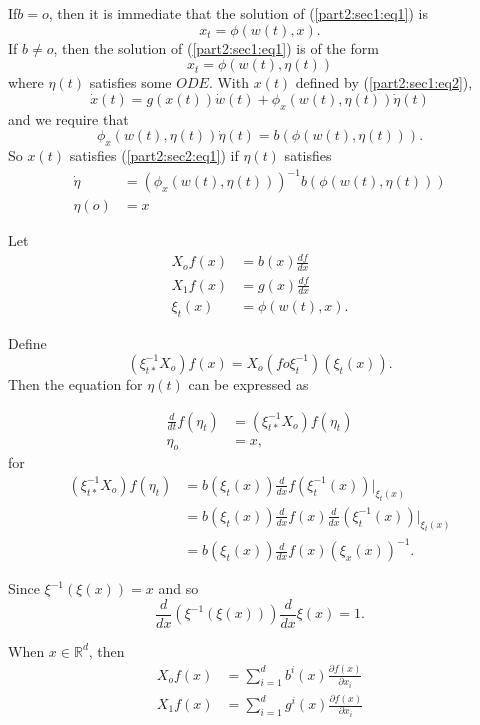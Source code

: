 If\pageoriginale $b=o$, then it is immediate that the solution of
(\ref{part2:sec1:eq1}) is  
$$
x_t = \phi (w(t),x).
$$
If $b \neq o$, then the solution  of (\ref{part2:sec1:eq1}) is of the form
\begin{equation*}
  x_t = \phi (w(t), \eta(t)) \tag{2}\label{part2:sec2:eq2}
\end{equation*}
where $\eta(t)$ satisfies some $ODE$. With $x(t)$ defined by (\ref{part2:sec1:eq2}),
$$
\dot{x}(t) = g(x(t))\dot{w}(t) + \phi_x(w(t), \eta(t))\dot{\eta}(t)
$$
and we require that 
$$
\phi_x (w(t), \eta(t))\dot{\eta}(t) = b(\phi(w(t), \eta(t))).
$$
So $x(t)$ satisfies (\ref{part2:sec2:eq1}) if $\eta(t)$ satisfies
\begin{align*}
  \dot{\eta} & = (\phi_x(w(t), \eta(t)))^{-1} b(\phi (w(t), \eta(t))) \\
  \eta (o) &= x
\end{align*}

\medskip
{}
 Let 
\begin{align*}
X_o f(x) & = b(x) \frac{df}{dx}\\
X_1 f(x) & = g(x) \frac{df}{dx}\\
\xi_t(x)   & =  \phi (w(t),x).
\end{align*}

Define
$$
(\xi^{-1}_{t*}X_o) f(x) =X_o (f o \xi^{-1}_t) (\xi_t(x)).
$$
Then the equation for $\eta(t)$ can be expressed as

\begin{align*}
  \frac{d}{dt}f(\eta _t)& = ( \xi ^{-1}_{t*}X_o) f(\eta_ t)\\
  \eta_o &= x, 
\end{align*}
for\pageoriginale 
\begin{align*}
  (\xi ^{-1}_{t*}X_o) f(\eta _t) &=b (\xi _t (x)) \frac{d}{dx}
  f(\xi^{-1}_{t}(x)) |_{\xi _t (x)}\\ 
  &= b(\xi _t (x)) \frac{d}{dx} f(x) \frac{d}{dx} (\xi ^{-1}_{t} (x))
  |_{\xi _t (x)}\\ 
  &= b(\xi_t (x)) \frac{d}{dx} f(x) (\xi _x (x))^{-1}. \tag{$\ast$}
\end{align*}

Since $\xi ^{-1}(\xi (x)) = x $ and so 
$$
\frac{d}{dx} (\xi^{-1}(\xi (x))) \frac{d}{dx} \xi (x) = 1. 
$$

When $x \in  \mathbb{R}^d $, then
\begin{align*}
  X_o f(x) & = \sum_{i=1}^{d}b^i (x) \frac{\partial f(x)}{\partial x_i} \\
  X_1f(x)&= \sum_{i=1}^{d} g^i (x) \frac{\partial f(x)}{\partial x_i} 
\end{align*}


